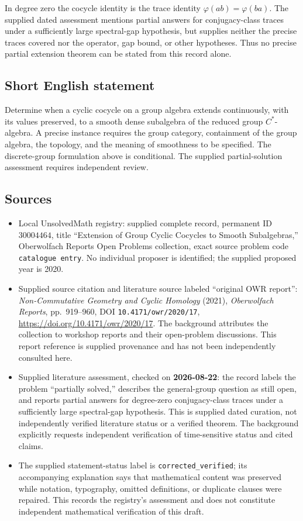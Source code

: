 \documentclass[11pt]{article}
\begin{document}
In degree zero the cocycle identity is the trace identity \(\varphi(ab)=\varphi(ba)\). The supplied dated assessment mentions partial answers for conjugacy-class traces under a sufficiently large spectral-gap hypothesis, but supplies neither the precise traces covered nor the operator, gap bound, or other hypotheses. Thus no precise partial extension theorem can be stated from this record alone.
\subsection{Short English statement}
Determine when a cyclic cocycle on a group algebra extends continuously, with its values preserved, to a smooth dense subalgebra of the reduced group \(C^*\)-algebra. A precise instance requires the group category, containment of the group algebra, the topology, and the meaning of smoothness to be specified. The discrete-group formulation above is conditional. The supplied partial-solution assessment requires independent review.
\subsection{Sources}
\begin{itemize}
\item Local UnsolvedMath registry: supplied complete record, permanent ID \(30004464\), title ``Extension of Group Cyclic Cocycles to Smooth Subalgebras,'' Oberwolfach Reports Open Problems collection, exact source problem code \texttt{catalogue entry}. No individual proposer is identified; the supplied proposed year is 2020.
\item Supplied source citation and literature source labeled ``original OWR report'': \emph{Non-Commutative Geometry and Cyclic Homology} (2021), \emph{Oberwolfach Reports}, pp.\ 919--960, DOI \texttt{10.4171/owr/2020/17}, \url{https://doi.org/10.4171/owr/2020/17}. The background attributes the collection to workshop reports and their open-problem discussions. This report reference is supplied provenance and has not been independently consulted here.
\item Supplied literature assessment, checked on \textbf{2026-08-22}: the record labels the problem ``partially solved,'' describes the general-group question as still open, and reports partial answers for degree-zero conjugacy-class traces under a sufficiently large spectral-gap hypothesis. This is supplied dated curation, not independently verified literature status or a verified theorem. The background explicitly requests independent verification of time-sensitive status and cited claims.
\item The supplied statement-status label is \texttt{corrected\_verified}; its accompanying explanation says that mathematical content was preserved while notation, typography, omitted definitions, or duplicate clauses were repaired. This records the registry's assessment and does not constitute independent mathematical verification of this draft.
\end{itemize}
\end{document}
